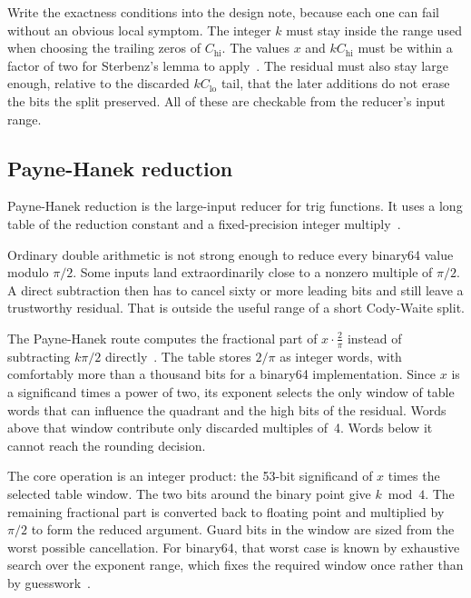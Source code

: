 \documentclass[manuscript, nonacm]{acmart}
\begin{document}
  Write the exactness conditions into the design note, because each one can
  fail without an obvious local symptom. The integer $k$ must stay inside
  the range used when choosing the trailing zeros of $C_\mathrm{hi}$. The
  values $x$ and $kC_\mathrm{hi}$ must be within a factor of two for
  Sterbenz's lemma to apply~\cite{handbook}. The residual must also stay
  large enough, relative to the discarded $kC_\mathrm{lo}$ tail, that the
  later additions do not erase the bits the split preserved. All of these
  are checkable from the reducer's input range.

  \subsection{Payne-Hanek reduction}

  Payne-Hanek reduction is the large-input reducer for trig functions. It
  uses a long table of the reduction constant and a fixed-precision integer
  multiply~\cite{muller}.

  Ordinary double arithmetic is not strong enough to reduce every binary64 value
  modulo $\pi/2$. Some inputs land extraordinarily close to a nonzero multiple
  of $\pi/2$. A direct subtraction then has to cancel sixty or more leading bits
  and still leave a trustworthy residual. That is outside the useful range of a
  short Cody-Waite split.

  The Payne-Hanek route computes the fractional part of
  $x \cdot \tfrac{2}{\pi}$ instead of subtracting $k\pi/2$ directly~\cite{payne1983}.
  The table stores $2/\pi$ as integer words, with comfortably more than a
  thousand bits for a binary64 implementation. Since $x$ is a significand times
  a power of two, its exponent selects the only window of table words that can
  influence the quadrant and the high bits of the residual. Words above that
  window contribute only discarded multiples of~4. Words below it cannot reach
  the rounding decision.

  The core operation is an integer product: the 53-bit significand of $x$ times
  the selected table window. The two bits around the binary point give
  $k \bmod 4$. The remaining fractional part is converted back to floating point
  and multiplied by $\pi/2$ to form the reduced argument. Guard bits in the
  window are sized from the worst possible cancellation. For binary64, that
  worst case is known by exhaustive search over the exponent range, which fixes
  the required window once rather than by guesswork~\cite{muller}.
\end{document}
